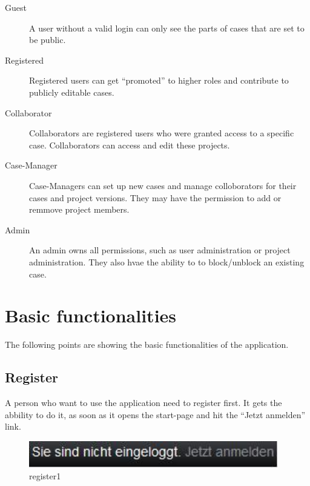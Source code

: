 \begin{description}
\item[Guest]
A user without a valid login can only see the parts of cases that are set to be public.
\item[Registered]
Registered users can get \enquote{promoted} to higher roles and contribute to publicly editable cases.
\item[Collaborator]
Collaborators are registered users who were granted access to a specific case. Collaborators can access and edit these projects.
\item[Case-Manager]
Case-Managers can set up new cases and manage colloborators for their cases and project versions. They may have the permission to add or remmove project members.
\item[Admin]
An admin owns all permissions, such as user administration or project administration. They also hvae the ability to to block/unblock an existing case.
\end{description}

\section{Basic functionalities}

The following points are showing the basic functionalities of the application.

\subsection{Register}

A person who want to use the application need to register first. It gets the abbility to do it, as soon as it opens the 
start-page and hit the \enquote{Jetzt anmelden} link.

\begin{figure}[!ht]
  \centering
    \includegraphics[width=0.97\textwidth]{images/basic_functionalities/reg1.jpg}
  \caption{register1}
  \label{fig:register1}
\end{figure}


